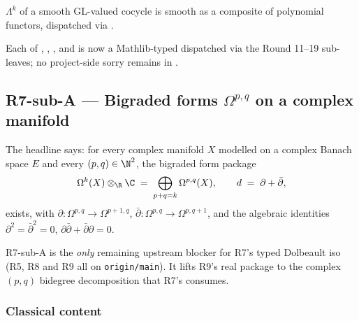 \begin{lemma}
\label{lem:r9subA-exp-r16}
\(\Lambda^{k}\) of a smooth GL-valued cocycle is smooth as a
composite of polynomial functors, dispatched via .
\leanok
\end{lemma}

\begin{lemma}
\label{lem:r9subA-closure-round20}
Each of ,
,
, and
 is now a Mathlib-typed
 dispatched via the Round 11--19 sub-leaves; no
project-side sorry remains in
.
\leanok
\end{lemma}

\subsection{R7-sub-A --- Bigraded forms \(\Omega^{p,q}\) on a complex manifold}
\label{subsec:gap-R7subA-bigraded-forms}

The headline says: for every complex manifold \(X\) modelled on a
complex Banach space \(E\) and every \((p,q)\in\N^{2}\), the bigraded
form package
\[
  \Omega^{k}(X)\otimes_{\R}\C \;=\; \bigoplus_{p+q=k}\Omega^{p,q}(X),
  \qquad
  d \;=\; \partial+\bar\partial,
\]
exists, with \(\partial:\Omega^{p,q}\to\Omega^{p+1,q}\),
\(\bar\partial:\Omega^{p,q}\to\Omega^{p,q+1}\), and the algebraic
identities \(\partial^{2}=\bar\partial^{2}=0\),
\(\partial\bar\partial+\bar\partial\partial=0\).

R7-sub-A is the \emph{only} remaining upstream blocker for R7's
typed Dolbeault iso (R5, R8 and R9 all on \texttt{origin/main}).
It lifts R9's real  package to the complex
\((p,q)\) bidegree decomposition that R7's
 consumes.

\subsubsection*{Classical content}

